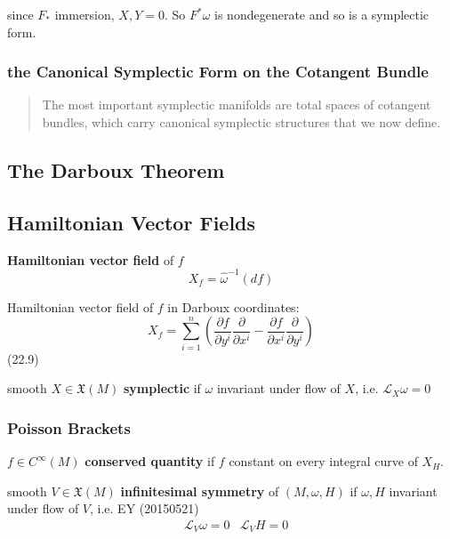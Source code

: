 \documentclass[11pt]{amsart}
\theoremstyle{definition}
\begin{document}
since $F_*$ immersion, $X,Y=0$.  So $F^*\omega$ is nondegenerate and so is a symplectic form.


\subsubsection{the Canonical Symplectic Form on the Cotangent Bundle}

\begin{quote}
The most important symplectic manifolds are total spaces of cotangent bundles, which carry canonical symplectic structures that we now define.
\end{quote}


\subsection{The Darboux Theorem}

\subsection{Hamiltonian Vector Fields}

\textbf{Hamiltonian vector field} of $f$
\[
X_f = \widehat{\omega}^{-1}(df)
\]

Hamiltonian vector field of $f$ in Darboux coordinates:
\begin{equation}
  X_f = \sum_{i=1}^n \left( \frac{ \partial f}{ \partial y^i} \frac{ \partial }{ \partial x^i } - \frac{ \partial f}{ \partial x^i} \frac{\partial}{ \partial y^i} \right)
\end{equation}
(22.9)



smooth $X \in \mathfrak{X}(M)$ \textbf{symplectic} if $\omega$ invariant under flow of $X$, i.e. $\mathcal{L}_X \omega =0$


\subsubsection{Poisson Brackets}

$f \in C^{\infty}(M)$ \textbf{conserved quantity} if $f$ constant on every integral curve of $X_H$.

smooth $V \in \mathfrak{X}(M)$ \textbf{infinitesimal symmetry} of $(M,\omega,H)$ if $\omega,H$ invariant under flow of $V$, i.e. EY (20150521)
\[
\begin{aligned}
  & \mathcal{L}_V \omega = 0
  & \mathcal{L}_V H = 0
\end{aligned}
\]
\end{document}
